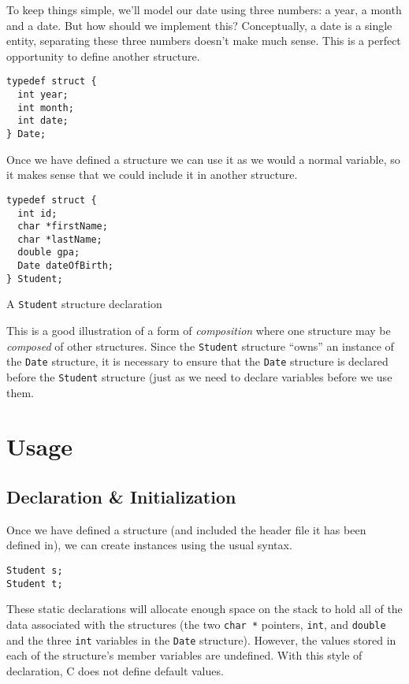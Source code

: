 To keep things simple, we'll model our date using three numbers: a
year, a month and a date.  But how should we implement this?  
Conceptually, a date is a single entity, separating these three 
numbers doesn't make much sense.  This is a perfect opportunity to 
define another structure.

\begin{verbatim}
typedef struct {
  int year;
  int month;
  int date;
} Date;
\end{verbatim}

Once we have defined a structure we can use it as we would a normal
variable, so it makes sense that we could include it in another structure.

\begin{listing}
\centering
\begin{verbatim}
typedef struct {
  int id;
  char *firstName;
  char *lastName;
  double gpa;
  Date dateOfBirth;
} Student;
\end{verbatim}
\caption{A \texttt{Student} structure declaration}
\label{code:c:studentStructure}
\end{listing}

This is a good illustration of a form of  
\emph{composition} where 
one structure may be \emph{composed} of other structures.  Since
the \texttt{Student} structure ``owns'' an instance of the
\texttt{Date} structure, it is necessary to ensure that 
the \texttt{Date} structure is declared before the 
\texttt{Student} structure (just as we need to declare 
variables before we use them.

\section{Usage}

\subsection{Declaration \& Initialization}

Once we have defined a structure (and included the header file
it has been defined in), we can create instances using the usual
syntax.

\begin{verbatim}
Student s;
Student t;
\end{verbatim}

These static declarations will allocate enough space on the stack
to hold all of the data associated with the structures (the two
\texttt{char *} pointers, \texttt{int}, and 
\texttt{double} and the three \texttt{int} variables
in the \texttt{Date} structure).  However, the values stored in 
each of the structure's member variables are undefined.  With
this style of declaration, C does not define default values.

